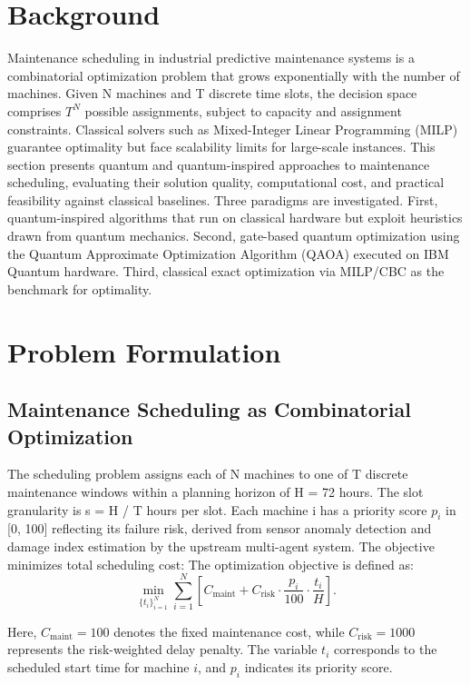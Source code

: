 \section{Background}
Maintenance scheduling in industrial predictive maintenance systems is a combinatorial optimization problem that grows exponentially with the number of machines. Given N machines and T discrete time slots, the decision space comprises $T^N$ possible assignments, subject to capacity and assignment constraints. Classical solvers such as Mixed-Integer Linear Programming (MILP) guarantee optimality but face scalability limits for large-scale instances. This section presents quantum and quantum-inspired approaches to maintenance scheduling, evaluating their solution quality, computational cost, and practical feasibility against classical baselines.
Three paradigms are investigated. First, quantum-inspired algorithms that run on classical hardware but exploit heuristics drawn from quantum mechanics. Second, gate-based quantum optimization using the Quantum Approximate Optimization Algorithm (QAOA) executed on IBM Quantum hardware. Third, classical exact optimization via MILP/CBC as the benchmark for optimality.

\section{Problem Formulation}
\subsection{Maintenance Scheduling as Combinatorial Optimization}
The scheduling problem assigns each of N machines to one of T discrete maintenance windows within a planning horizon of H = 72 hours. The slot granularity is s = H / T hours per slot. Each machine i has a priority score $p_i$ in [0, 100] reflecting its failure risk, derived from sensor anomaly detection and damage index estimation by the upstream multi-agent system.
The objective minimizes total scheduling cost:
The optimization objective is defined as:
\begin{equation}
\min_{ \{t_i\}_{i=1}^N } 
\sum_{i=1}^{N} 
\left[
C_{\text{maint}} 
+ C_{\text{risk}} \cdot \frac{p_i}{100} \cdot \frac{t_i}{H}
\right].
\end{equation}

Here, $C_{\text{maint}} = 100$ denotes the fixed maintenance cost, while $C_{\text{risk}} = 1000$ represents the risk-weighted delay penalty. The variable $t_i$ corresponds to the scheduled start time for machine $i$, and $p_i$ indicates its priority score.

